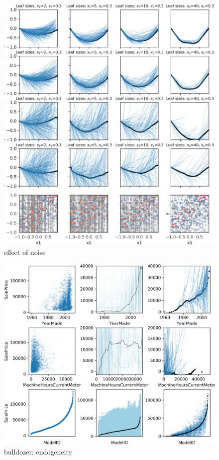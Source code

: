 \documentclass[12pt]{article}
\begin{document}
\begin{figure}[htbp]
\begin{center}
\includegraphics[scale=0.7]{images/meta_additivity_noise.png}
\caption{effect of noise}
\label{fig:meta_noise}
\end{center}
\end{figure}

\begin{figure}[htbp]
\begin{center}
\includegraphics[scale=0.7]{images/bulldozer.png}
\caption{bulldozer; endogeneity}
\label{fig:bulldozer}
\end{center}
\end{figure}
\end{document}
